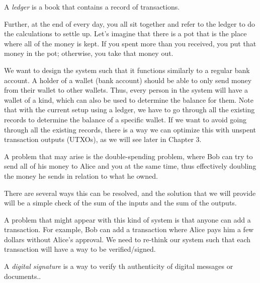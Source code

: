 \documentclass[12pt,a4paper]{report}
\begin{document}
\begin{tcolorbox}[colframe=black!75, colback=white, sharp corners, fonttitle=\bfseries, boxrule=0.5pt, title=\faInfoCircle\ Definition 1-2]
A \textit{ledger} is a book that contains a record of transactions.
\end{tcolorbox}

Further, at the end of every day, you all sit together and refer to the ledger to do the calculations to settle up. Let’s imagine that there is a pot 
that is the place where all of the money is kept. If you spent more than you received, you put that money in the pot; otherwise, you take that money out.

We want to design the system such that it functions similarly to a regular bank account. A holder of a wallet (bank account) should be able to only send money from their wallet to other wallets. Thus, every person in the system will have a wallet of a kind, which can also be used to determine the balance for them. Note that with the current setup using a ledger, we have to go through all the existing records to determine the balance of a specific wallet. If we want to avoid going through all the existing records, there is a way we can optimize this with unspent transaction outputs (UTXOs), as we will see later in Chapter 3.

A problem that may arise is the double-spending problem, where Bob can try to send all of his money to Alice and you at the same time, thus effectively doubling the money he sends in relation to what he owned. 

There are several ways this can be resolved, and the solution that we will provide will be a simple check of the sum of the inputs and the sum of the outputs.

A problem that might appear with this kind of system is that anyone can add a transaction. For example, Bob can add a transaction where Alice pays him a few dollars without Alice’s approval. We need to re-think our system such that each transaction will have a way to be verified/signed.

\vspace{0.5em}

\begin{tcolorbox}[colframe=black!75, colback=white, sharp corners, fonttitle=\bfseries, boxrule=0.5pt, title=\faInfoCircle\ Definition 1-3]
A \textit{digital signature} is a way to verify th
authenticity of digital messages or documents..
\end{tcolorbox}
\end{document}
